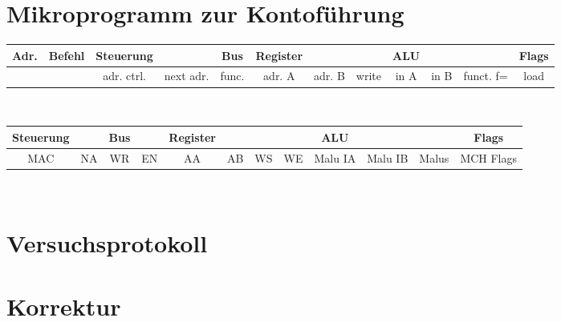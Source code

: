 \documentclass[paper=a4, fontsize=11pt]{scrartcl}
\numberwithin{equation}{section}
\numberwithin{figure}{section}
\numberwithin{table}{section}
\begin{document}
\newpage

\section{Mikroprogramm zur Kontoführung}

\begin{tabular}{|c|c|cc|c|ccc|ccc|c|}
\hline
Adr. & Befehl &Steuerung & & Bus & Register & & & ALU & & & Flags \\
\hline
& & adr. ctrl. & next adr. & func. & adr. A & adr. B & write & in A & in B & funct. f= & load \\
\hline
\end{tabular} \\

\begin{tabular}{|cc|cc|cccc|ccc|c|}
\hline
Steuerung & & Bus & & Register & & & & ALU & & & Flags \\
\hline
MAC & NA & WR & EN & AA & AB & WS & WE & Malu IA & Malu IB & Malus & MCH Flags \\
\hline
\end{tabular} \\


\newpage

\section{Versuchsprotokoll}


\newpage

\section{Korrektur}
\end{document}

